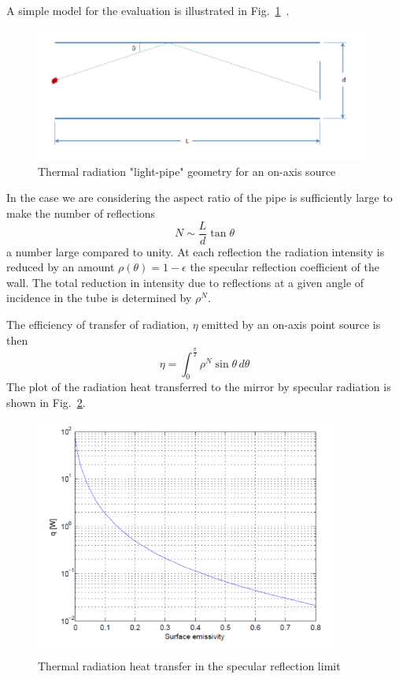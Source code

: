 A simple model for the evaluation is illustrated in Fig.~\ref{fig:specular}~\cite{mosher_1976}.
\begin{figure}[htbp]
\begin{center}
 \includegraphics[width=11cm]{Sec_SiteInfra/Cryotraps/specular.pdf}
			\caption{Thermal radiation "light-pipe" geometry for an on-axis source}
\label{fig:specular}
\end{center}
\end{figure}

In the case we are considering the aspect ratio of the pipe is sufficiently large to make the number of reflections
\begin{equation}
N \sim \frac{L}{d} \tan \theta	
\end{equation}
a number large compared to unity. At each reflection the radiation intensity is reduced by an amount $\rho(\theta)=1-\epsilon$ the specular reflection coefficient of the wall. The total reduction in intensity due to reflections at a given angle of incidence in the tube is determined by $\rho^N$.

The efficiency of transfer of radiation, $\eta$ emitted by an on-axis point source is then
\begin{equation}
\eta = \int_0^{\frac{\pi}{2}} \rho^N \sin \theta \, d\theta
\end{equation}
The plot of the radiation heat transferred to the mirror by specular radiation is shown in Fig.~\ref{fig:q_eps_specular}.
\begin{figure}[htbp]
\begin{center}
 \includegraphics[width=10cm]{Sec_SiteInfra/Cryotraps/q_eps_specular.pdf}
			\caption{Thermal radiation heat transfer in the specular reflection limit}
\label{fig:q_eps_specular}
\end{center}
\end{figure}

